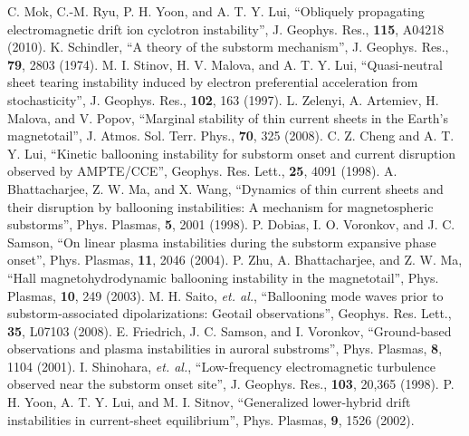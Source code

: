 \documentclass{gshs_thesis}
\begin{document}
\clearpage
\begin{thebibliography}{99}\begin{onehalfspace}

C. Mok, C.-M. Ryu, P. H. Yoon, and A. T. Y. Lui, ``Obliquely propagating electromagnetic drift ion cyclotron instability'', J. Geophys. Res., {\bf 115}, A04218 (2010).
 K. Schindler, ``A theory of the substorm mechanism'', J. Geophys. Res., {\bf 79}, 2803 (1974).
 M. I. Stinov, H. V. Malova, and A. T. Y. Lui, ``Quasi-neutral sheet tearing instability induced by electron preferential acceleration from stochasticity'', J. Geophys. Res., {\bf 102}, 163 (1997).
 L. Zelenyi, A. Artemiev, H. Malova, and V. Popov, ``Marginal stability of thin current sheets in the Earth's magnetotail'', J. Atmos. Sol. Terr. Phys., {\bf 70}, 325 (2008).
 C. Z. Cheng and A. T. Y. Lui, ``Kinetic ballooning instability for substorm onset and current disruption observed by AMPTE/CCE'', Geophys. Res. Lett., {\bf 25}, 4091 (1998).
 A. Bhattacharjee, Z. W. Ma, and X. Wang, ``Dynamics of thin current sheets and their disruption by ballooning instabilities: A mechanism for magnetospheric substorms'', Phys. Plasmas, {\bf 5}, 2001 (1998).
 P. Dobias, I. O. Voronkov, and J. C. Samson, ``On linear plasma instabilities during the substorm expansive phase onset'', Phys. Plasmas, {\bf 11}, 2046 (2004).
 P. Zhu, A. Bhattacharjee, and Z. W. Ma, ``Hall magnetohydrodynamic ballooning instability in the magnetotail'', Phys. Plasmas, {\bf 10}, 249 (2003).
 M. H. Saito, {\it et. al.}, ``Ballooning mode waves prior to substorm-associated dipolarizations: Geotail observations'', Geophys. Res. Lett., {\bf 35}, L07103 (2008).
 E. Friedrich, J. C. Samson, and I. Voronkov, ``Ground-based observations and plasma instabilities in auroral substroms'', Phys. Plasmas, {\bf 8}, 1104 (2001).
 I. Shinohara, {\it et. al.}, ``Low-frequency electromagnetic turbulence observed near the substorm onset site'', J. Geophys. Res., {\bf 103}, 20,365 (1998).
 P. H. Yoon, A. T. Y. Lui, and M. I. Sitnov, ``Generalized lower-hybrid drift instabilities in current-sheet equilibrium'', Phys. Plasmas, {\bf 9}, 1526 (2002).

\end{onehalfspace}
\end{thebibliography}
\end{document}
